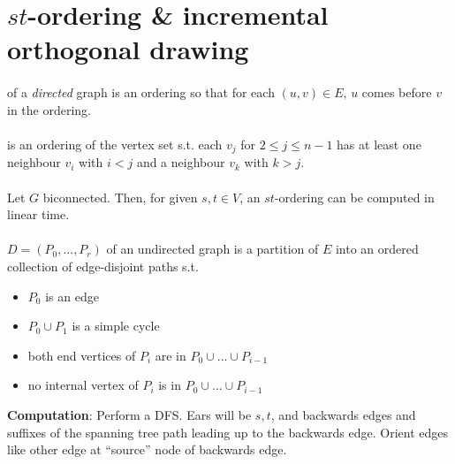 \documentclass[10pt,twocolumn]{article}
\begin{document}
\setcounter{section}{6}
\section{$st$-ordering \& incremental orthogonal drawing}

\paragraph{} of a \textit{directed} graph is an
ordering so that for each $(u,v) \in E$, $u$ comes before $v$ in the ordering.

\paragraph{} is an ordering of the vertex set s.t. each $v_j$
for $2 \leq j \leq n-1$ has at least one neighbour $v_i$ with $i<j$ and a
neighbour $v_k$ with $k > j$.

\paragraph{} Let $G$ biconnected. Then, for given $s, t \in V$, an
$st$-ordering can be computed in linear time.

\paragraph{} $D=(P_0, ..., P_r)$ of an undirected
graph is a partition of $E$ into an ordered collection of edge-disjoint paths
s.t.
\begin{itemize}
\item $P_0$ is an edge
\item $P_0 \cup P_1$ is a simple cycle
\item both end vertices of $P_i$ are in $P_0 \cup ... \cup P_{i-1}$
\item no internal vertex of $P_i$ is in $P_0 \cup ... \cup P_{i-1}$
\end{itemize}
\textbf{Computation}: Perform a DFS. Ears will be ${s,t}$, and backwards edges and suffixes
of the spanning tree path leading up to the backwards edge. Orient edges like
other edge at ``source'' node of backwards edge.
\end{document}
